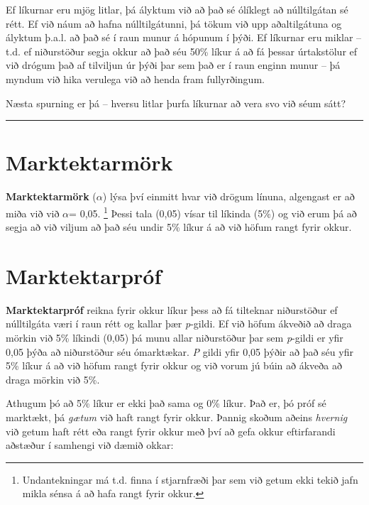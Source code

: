 \documentclass[
]{book}
\begin{document}
Ef líkurnar eru mjög litlar, þá ályktum við að það sé ólíklegt að núlltilgátan sé rétt. Ef við náum að hafna núlltilgátunni, þá tökum við upp aðaltilgátuna og ályktum þ.a.l. að það sé í raun munur á hópunum í þýði. Ef líkurnar eru miklar -- t.d. ef niðurstöður segja okkur að það séu 50\% líkur á að fá þessar úrtakstölur ef við drógum það af tilviljun úr þýði þar sem það er í raun enginn munur -- þá myndum við hika verulega við að henda fram fullyrðingum.

Næsta spurning er þá -- hversu litlar þurfa líkurnar að vera svo við séum sátt?

\begin{center}\rule{0.5\linewidth}{0.5pt}\end{center}

\hypertarget{marktektarmuxf6rk}{%
\section{Marktektarmörk}\label{marktektarmuxf6rk}}

\textbf{Marktektarmörk} (\(\alpha\)) lýsa því einmitt hvar við drögum línuna, algengast er að miða við við \(\alpha\)= 0,05. \footnote{Undantekningar má t.d. finna í stjarnfræði þar sem við getum ekki tekið jafn mikla sénsa á að hafa rangt fyrir okkur.} Þessi tala (0,05) vísar til líkinda (5\%) og við erum þá að segja að við viljum að það séu undir 5\% líkur á að við höfum rangt fyrir okkur.

\hypertarget{marktektarpruxf3f}{%
\section{Marktektarpróf}\label{marktektarpruxf3f}}

\textbf{Marktektarpróf} reikna fyrir okkur líkur þess að fá tilteknar niðurstöður ef núlltilgáta væri í raun rétt og kallar þær \emph{p}-gildi. Ef við höfum ákveðið að draga mörkin við 5\% líkindi (0,05) þá munu allar niðurstöður þar sem \emph{p}-gildi er yfir 0,05 þýða að niðurstöður séu ómarktækar. \emph{P} gildi yfir 0,05 þýðir að það séu yfir 5\% líkur á að við höfum rangt fyrir okkur og við vorum jú búin að ákveða að draga mörkin við 5\%.

Athugum þó að 5\% líkur er ekki það sama og 0\% líkur. Það er, þó próf sé marktækt, þá \emph{gætum} við haft rangt fyrir okkur. Þannig skoðum aðeins \emph{hvernig} við getum haft rétt eða rangt fyrir okkur með því að gefa okkur eftirfarandi aðstæður í samhengi við dæmið okkar:
\end{document}
